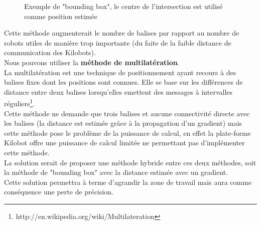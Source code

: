 \documentclass[a4paper,8pt]{report}
\begin{document}
\begin{figure}[!h]
    \centering
    \caption{Exemple de "bounding box", le centre de l’intersection est utilis\'e comme position estim\'ee}
\end{figure}

Cette m\'ethode augmenterait le nombre de balises par rapport au nombre de robots utiles de mani\`ere trop importante (du faite de la faible distance de communication des Kilobots).\\
Nous pouvons utiliser la \textbf{m\'ethode de multilat\'eration}.\\
La multilat\'eration est une technique de positionnement ayant recours \`a des balises fixes dont les positions sont connues. Elle se base sur les diff\'erences de distance entre deux balises lorsqu'elles emettent des messages \`a intervalles r\'eguliers\footnote{http://en.wikipedia.org/wiki/Multilateration}.\\
Cette m\'ethode ne demande que trois balises et aucune connectivit\'e directe avec les balises (la distance est estim\'ee gr\^ace \`a la propagation d'un gradient) mais cette m\'ethode pose le probl\`eme de la puissance de calcul, en effet la plate-forme Kilobot offre une puissance de calcul limit\'ee ne permettant pas d'impl\'ementer cette m\'ethode.\\

\smallskip
La solution serait de proposer une m\'ethode hybride entre ces deux m\'ethodes, soit la m\'ethode de "bounding box" avec la distance estim\'ee avec un gradient.\\
Cette solution permettra \`a terme d'agrandir la zone de travail mais aura comme cons\'equence une perte de pr\'ecision.\\
\end{document}
